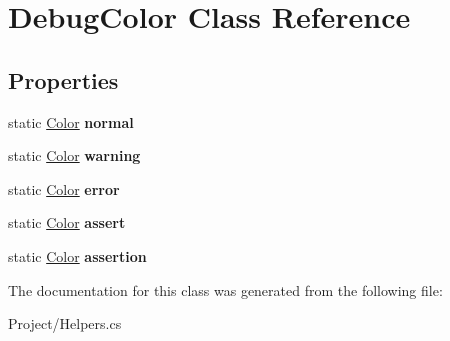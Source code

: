 \hypertarget{class_debug_color}{}\section{Debug\+Color Class Reference}
\label{class_debug_color}
\subsection*{Properties}
\begin{DoxyCompactItemize}
\item 
\mbox{\label{class_debug_color_abef85eacf237413f059783f608e47065}} 
static \hyperlink{struct_lerp2_a_p_i_1_1_optimizers_1_1_color}{Color} {\bfseries normal}
\item 
\mbox{\label{class_debug_color_af0d2fcc0a3b72f6cd44943134d9db47e}} 
static \hyperlink{struct_lerp2_a_p_i_1_1_optimizers_1_1_color}{Color} {\bfseries warning}
\item 
\mbox{\label{class_debug_color_ab922af5a97989db2f501000dc964cfd8}} 
static \hyperlink{struct_lerp2_a_p_i_1_1_optimizers_1_1_color}{Color} {\bfseries error}
\item 
\mbox{\label{class_debug_color_a4bd731e4516e823f75f7e5acd9e6db2d}} 
static \hyperlink{struct_lerp2_a_p_i_1_1_optimizers_1_1_color}{Color} {\bfseries assert}
\item 
\mbox{\label{class_debug_color_a855e18e63ab84c264af29af7c14caa88}} 
static \hyperlink{struct_lerp2_a_p_i_1_1_optimizers_1_1_color}{Color} {\bfseries assertion}
\end{DoxyCompactItemize}


The documentation for this class was generated from the following file\+:\begin{DoxyCompactItemize}
\item 
Project/Helpers.\+cs\end{DoxyCompactItemize}
